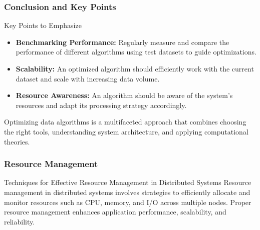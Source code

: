 \documentclass{beamer}
\begin{document}
\begin{frame}[fragile]
    \frametitle{Conclusion and Key Points}
    \begin{block}{Key Points to Emphasize}
        \begin{itemize}
            \item \textbf{Benchmarking Performance:} Regularly measure and compare the performance of different algorithms using test datasets to guide optimizations.
            \item \textbf{Scalability:} An optimized algorithm should efficiently work with the current dataset and scale with increasing data volume.
            \item \textbf{Resource Awareness:} An algorithm should be aware of the system's resources and adapt its processing strategy accordingly.
        \end{itemize}
    \end{block}
    Optimizing data algorithms is a multifaceted approach that combines choosing the right tools, understanding system architecture, and applying computational theories.
\end{frame}

\begin{frame}[fragile]
    \frametitle{Resource Management}
    \begin{block}{Techniques for Effective Resource Management in Distributed Systems}
        Resource management in distributed systems involves strategies to efficiently allocate and monitor resources such as CPU, memory, and I/O across multiple nodes. Proper resource management enhances application performance, scalability, and reliability.
    \end{block}
\end{frame}
\end{document}
